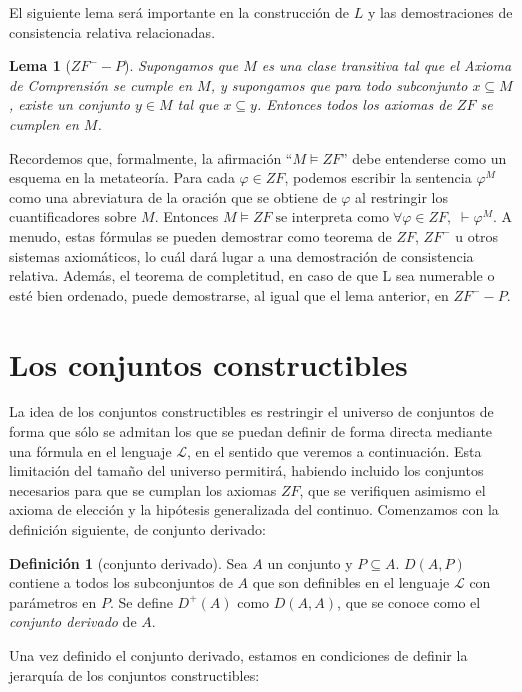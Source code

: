\documentclass[11pt,a4paper]{book}
\theoremstyle{plain}
\newtheorem{lema}[teorema]{Lema}
\theoremstyle{definition}
\newtheorem{definicion}[teorema]{Definición}
\theoremstyle{remark}
\begin{document}
El siguiente lema será importante en la construcción de $L$ y las demostraciones de consistencia relativa relacionadas. 

\begin{lema} [$ZF^- - P$]
Supongamos que $M$ es una clase transitiva tal que el Axioma de Comprensión se cumple en $M$, y supongamos que para todo subconjunto $x \subseteq M$, existe un conjunto $y \in M$ tal que $x \subseteq y$. Entonces todos los axiomas de $ZF$ se cumplen en $M$.
\end{lema}

Recordemos que, formalmente, la afirmación ``$M \models ZF$'' debe entenderse como un esquema en la metateoría. Para cada $\varphi \in ZF$, podemos escribir la sentencia $\varphi^{M}$ como una abreviatura de la oración que se obtiene de $\varphi$ al restringir los cuantificadores sobre $M$. Entonces $M \models ZF \;\text{se interpreta como}\; \forall \varphi \in ZF,\; \vdash \varphi^M$. A menudo, estas fórmulas se pueden demostrar como teorema de $ZF$, $ZF^-$ u otros sistemas axiomáticos, lo cuál dará lugar a una demostración de consistencia relativa. Además, el teorema de completitud, en caso de que $\mathrm{L}$ sea numerable o esté bien ordenado, puede demostrarse, al igual que el lema anterior, en $ZF^- - P$.

\section{Los conjuntos constructibles}

La idea de los conjuntos constructibles es restringir el universo de conjuntos de forma que sólo se admitan los que se puedan definir de forma directa mediante una fórmula en el lenguaje $\mathcal{L}$, en el sentido que veremos a continuación. Esta limitación del tamaño del universo permitirá, habiendo incluido los conjuntos necesarios para que se cumplan los axiomas $ZF$, que se verifiquen asimismo el axioma de elección y la hipótesis generalizada del continuo. Comenzamos con la definición siguiente, de conjunto derivado:

\begin{definicion}[conjunto derivado]
  Sea $A$ un conjunto y $P \subseteq A$. $D(A, P)$ contiene a todos los subconjuntos de $A$ que son definibles en el lenguaje $\mathcal{L}$ con parámetros en $P$. Se define $D^+(A)$ como $D(A,A) $, que se conoce como el \textit{conjunto derivado} de $A$.
\end{definicion}

Una vez definido el conjunto derivado, estamos en condiciones de definir la jerarquía de los conjuntos constructibles:
\end{document}
